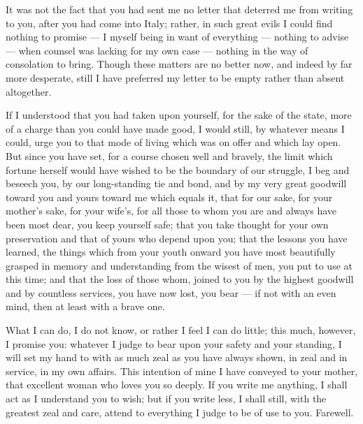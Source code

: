 

 It was not the fact that you had sent me no letter that deterred me from writing to you, after you had come into Italy; rather, in such great evils I could find nothing to promise --- I myself being in want of everything --- nothing to advise --- when counsel was lacking for my own case --- nothing in the way of consolation to bring. Though these matters are no better now, and indeed by far more desperate, still I have preferred my letter to be empty rather than absent altogether.

 If I understood that you had taken upon yourself, for the sake of the state, more of a charge than you could have made good, I would still, by whatever means I could, urge you to that mode of living which was on offer and which lay open. But since you have set, for a course chosen well and bravely, the limit which fortune herself would have wished to be the boundary of our struggle, I beg and beseech you, by our long-standing tie and bond, and by my very great goodwill toward you and yours toward me which equals it, that for our sake, for your mother's sake, for your wife's, for all those to whom you are and always have been most dear, you keep yourself safe; that you take thought for your own preservation and that of yours who depend upon you; that the lessons you have learned, the things which from your youth onward you have most beautifully grasped in memory and understanding from the wisest of men, you put to use at this time; and that the loss of those whom, joined to you by the highest goodwill and by countless services, you have now lost, you bear --- if not with an even mind, then at least with a brave one.

 What I can do, I do not know, or rather I feel I can do little; this much, however, I promise you: whatever I judge to bear upon your safety and your standing, I will set my hand to with as much zeal as you have always shown, in zeal and in service, in my own affairs. This intention of mine I have conveyed to your mother, that excellent woman who loves you so deeply. If you write me anything, I shall act as I understand you to wish; but if you write less, I shall still, with the greatest zeal and care, attend to everything I judge to be of use to you. Farewell.
